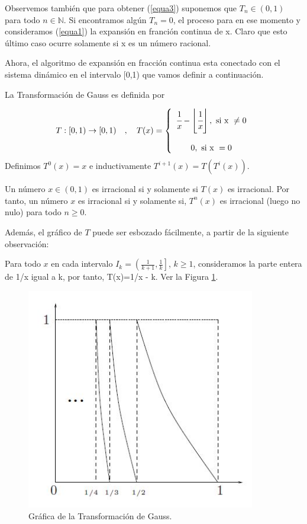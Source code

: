 \begin{obs}
Observemos también que para obtener (\ref{equa3}) suponemos que $T_{n}\in (0,1)$ para todo $n\in\mathbb{N}.$ Si encontramos algún $T_{n}=0$, el proceso para en ese momento y consideramos (\ref{equa1}) la expansión en franción continua de x. Claro que esto último caso ocurre solamente si x es un número racional.
\end{obs}

Ahora, el algoritmo de expansión en fracción continua esta conectado con el sistema dinámico en el intervalo [0,1) que vamos definir a continuación.

\begin{defi}
La Transformación de Gauss es definida por

\[
T:[0,1) \rightarrow[0,1)\quad,\quad T(x)=\left\{\begin{array}{c}
\cfrac{1}{x}-\left\lfloor\cfrac{1}{x}\right\rfloor, \text{ si x } \neq 0  \\\\
0, \text{ si x }  = 0
\end{array}\right.
\]
Definimos $T^{0}(x)=x$ e inductivamente $T^{i+1}(x)=T(T^{i}(x))$.
\end{defi}

\begin{obs}
Un número $x\in (0,1)$ es irracional si y solamente si $T(x)$ es irracional. Por tanto, un número $x$ es irracional si y solamente si, $T^{n}(x)$ es irracional (luego no nulo) para todo $n\geq0.$
\label{obs2}
\end{obs}

Además, el gráfico de $T$ puede ser esbozado fácilmente, a partir de la siguiente observación:
\begin{obs}
Para todo $x$ en cada intervalo $I_{k}=\left(\frac{1}{k+1},\frac{1}{k}\right]$, $k\geq1$, consideramos la parte entera de 1/x igual a k, por tanto, T(x)=1/x - k. Ver la Figura \ref{fig1}.
\end{obs}
\begin{figure}[h]
    \centering
    \includegraphics[width=10cm]{chapter1/TG.JPG}
    \caption{Gráfica de la Transformación de Gauss.}
    \label{fig1}
\end{figure}

